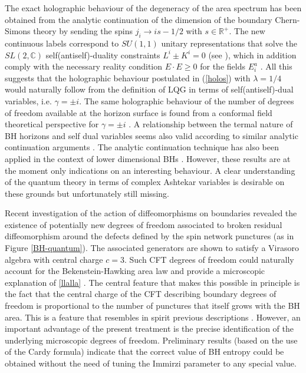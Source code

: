 \documentclass[aps, nofootinbib,superscriptaddress,12pt]{revtex4-2}
\newcommand{\C}{\mathbb{C}}
\newcommand{\R}{\mathbb{R}}
\begin{document}
The exact holographic behaviour of the degeneracy of the area spectrum has been obtained from the analytic continuation of the  dimension of the boundary Chern-Simons theory by sending the spins $j_i\to i s-1/2$  with $s\in \R^+$\cite{Frodden:2012dq, Han:2014xna, Achour:2014eqa, Geiller:2013pya}.  The new continuous labels correspond to $SU(1,1)$ unitary representations that solve the $SL(2,\C)$ self(antiself)-duality constraints 
$L^i\pm K^i=0$ (see \cite{Perez:2012wv}), which in addition comply with the necessary reality condition $E\cdot E\ge 0$ for the fields $E^a_i$ \cite{Frodden:2012dq}.
All this suggests that the holographic behaviour postulated in (\ref{holos}) with $\lambda=1/4$ would naturally follow from the definition of LQG in terms of self(antiself)-dual variables, i.e.
$\gamma=\pm i$.  The same holographic behaviour of the number of degrees of freedom available at the horizon surface
is found from a conformal field theoretical perspective for $\gamma=\pm i$ \cite{Ghosh:2014rra}. A relationship between the termal nature of BH horizons and self dual variables seems also valid according to similar analytic continuation arguments \cite{Pranzetti:2013lma}.    
The analytic continuation technique has also been applied in the context of lower dimensional BHs \cite{Frodden:2012nu}. 
However, these results are at the moment only indications on an interesting behaviour. A clear understanding of the quantum theory in terms of complex Ashtekar variables is desirable on these grounds but unfortunately still missing.

Recent investigation of the action of diffeomorphisms on boundaries \cite{Ghosh:2014rra, Freidel:2015gpa, Freidel:2016bxd} revealed the
existence of potentially new degrees of freedom associated to broken residual diffeomorphism around the defects defined by the spin network punctures (as in Figure \ref{BH-quantum}). The associated generators are shown to satisfy a Virasoro algebra with central charge $c=3$. Such CFT degrees of freedom could
naturally account for the Bekenstein-Hawking area law and provide a microscopic explanation of \eqref{llalla} . The central feature that makes this
possible in principle is the fact that the central charge of
the CFT describing boundary degrees of freedom is proportional  to  the  number  of  punctures  that  itself  grows
with  the  BH  area.   This  is  a  feature  that  resembles  in
spirit previous descriptions \cite{Carlip:1998wz,Carlip:1999cy, Carlip:2005zn, Carlip:2002be}.  However,  an important
advantage of the present treatment is the precise identification of the underlying microscopic degrees of freedom.
Preliminary results (based on the use of the Cardy formula) indicate that the correct value of BH entropy 
could be obtained without the need of tuning the Immirzi parameter to any special value.
\end{document}
